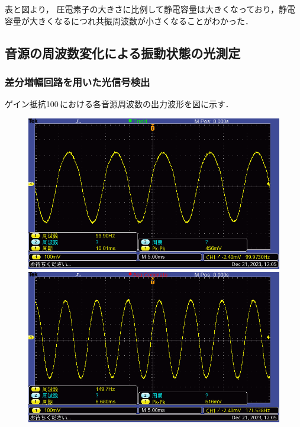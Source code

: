 \documentclass{ltjsarticle}
\begin{document}
		表と図より，
		圧電素子の大きさに比例して静電容量は大きくなっており，静電容量が大きくなるにつれ共振周波数が小さくなることがわかった．
\clearpage
	\subsection{音源の周波数変化による振動状態の光測定}
		\subsubsection{差分増幅回路を用いた光信号検出}
			ゲイン抵抗100\,\Omega における各音源周波数の出力波形を図に示す．
			\begin{figure}[H]
			\centering
			\begin{minipage}{0.4\columnwidth}
			\centering
			\includegraphics[width = \columnwidth]{figs/F0006TEK.PNG}
			\end{minipage}
			\hspace{0.04\columnwidth}
			\begin{minipage}{0.4\columnwidth}
			\centering
			\includegraphics[width = \columnwidth]{figs/F0007TEK.PNG}

\end{minipage}
\end{figure}
\end{document}
